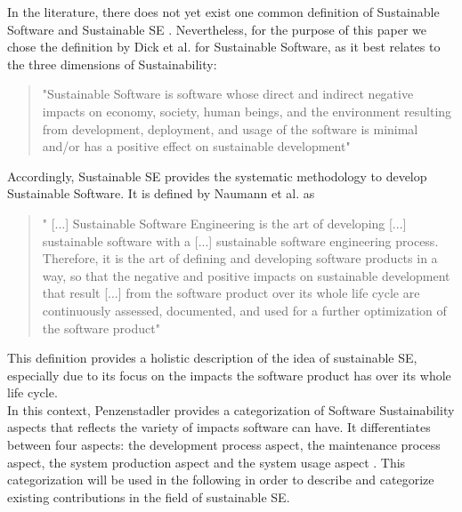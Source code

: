 \documentclass[oribibl]{llncs}
\begin{document}
In the literature, there does not yet exist one common definition of Sustainable Software and Sustainable SE \cite{venters_software_2014}. Nevertheless, for the purpose of this paper we chose the definition by Dick et al. \cite{dick_model_2010} for Sustainable Software, as it best relates to the three dimensions of Sustainability: 
\begin{quote}
	"Sustainable Software is software whose direct and indirect negative impacts on economy, society, human beings, and the environment resulting from development, deployment, and usage of the software is minimal and/or has a positive effect on sustainable development" \cite[p.\,3]{dick_model_2010}
\end{quote}
Accordingly, Sustainable SE provides the systematic methodology to develop Sustainable Software. It is defined by Naumann et al. as
\begin{quote}
	" [...] Sustainable Software Engineering is the art of developing [...] sustainable software with a [...] sustainable software engineering process. Therefore, it is the art of defining and developing software products in a way, so that the negative and positive impacts on sustainable development that result [...] from the software product over its whole life cycle are continuously assessed, documented, and used for a further optimization of the software product" \cite[p.\,3]{naumann_greensoft_2011} %
\end{quote}
This definition provides a holistic description of the idea of sustainable SE, especially due to its focus on the impacts the software product has over its whole life cycle.\\ %
In this context, Penzenstadler \cite{penzenstadler_supporting_2012} provides a categorization of Software Sustainability aspects that reflects the variety of impacts software can have. It differentiates between four aspects: the development process aspect, the maintenance process aspect, the system production aspect and the system usage aspect \cite{penzenstadler_supporting_2012}. %
This categorization will be used in the following in order to describe and categorize existing contributions in the field of sustainable SE.
\end{document}
